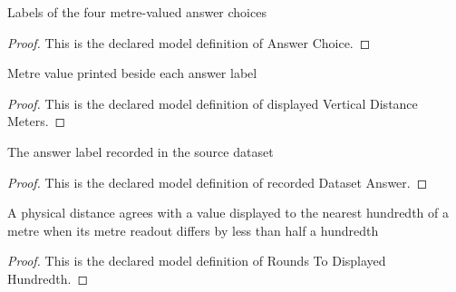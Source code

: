 \begin{definition}
  \label{def:physics:phyx-mini-0733:phyxminiproblems-problemphyxmini0733-answerchoice}
  Labels of the four metre-valued answer choices
\end{definition}
\begin{proof}
  This is the declared model definition of Answer Choice.
\end{proof}
\begin{definition}
  \label{def:physics:phyx-mini-0733:phyxminiproblems-problemphyxmini0733-displayedverticaldistancemeters}
  Metre value printed beside each answer label
\end{definition}
\begin{proof}
  This is the declared model definition of displayed Vertical Distance Meters.
\end{proof}
\begin{definition}
  \label{def:physics:phyx-mini-0733:phyxminiproblems-problemphyxmini0733-recordeddatasetanswer}
  The answer label recorded in the source dataset
\end{definition}
\begin{proof}
  This is the declared model definition of recorded Dataset Answer.
\end{proof}
\begin{definition}
  \label{def:physics:phyx-mini-0733:phyxminiproblems-problemphyxmini0733-roundstodisplayedhundredth}
  A physical distance agrees with a value displayed to the nearest hundredth of a metre when its metre readout differs by less than half a hundredth
\end{definition}
\begin{proof}
  This is the declared model definition of Rounds To Displayed Hundredth.
\end{proof}
